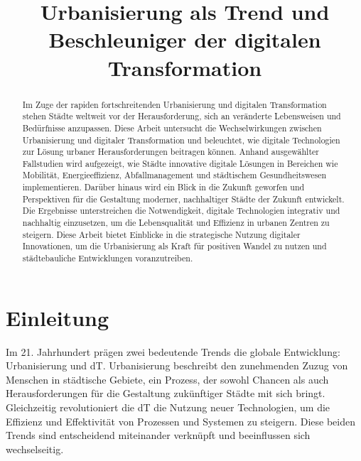 \documentclass[conference,compsoc,final,a4paper, onecolumn, 11pt]{IEEEtran}
\newcommand{\dokumententitel}[0]{Urbanisierung als Trend und Beschleuniger der digitalen Transformation}
\begin{document}
\title{\dokumententitel}

\author{
  \and
  \and
}

\maketitle
\thispagestyle{plain}
\pagestyle{plain}

\begin{abstract}
Im Zuge der rapiden fortschreitenden Urbanisierung und digitalen Transformation stehen Städte weltweit vor der Herausforderung, sich an veränderte Lebensweisen und Bedürfnisse anzupassen. 
Diese Arbeit untersucht die Wechselwirkungen zwischen Urbanisierung und digitaler Transformation und beleuchtet, wie digitale Technologien zur Lösung urbaner Herausforderungen beitragen können. 
Anhand ausgewählter Fallstudien wird aufgezeigt, wie Städte innovative digitale Lösungen in Bereichen wie Mobilität, Energieeffizienz, Abfallmanagement und städtischem Gesundheitswesen implementieren. 
Darüber hinaus wird ein Blick in die Zukunft geworfen und Perspektiven für die Gestaltung moderner, nachhaltiger Städte der Zukunft entwickelt. 
Die Ergebnisse unterstreichen die Notwendigkeit, digitale Technologien integrativ und nachhaltig einzusetzen, um die Lebensqualität und Effizienz in urbanen Zentren zu steigern. 
Diese Arbeit bietet Einblicke in die strategische Nutzung digitaler Innovationen, um die Urbanisierung als Kraft für positiven Wandel zu nutzen und städtebauliche Entwicklungen voranzutreiben.
\end{abstract}

{\tableofcontents}


\section{Einleitung}
Im 21. Jahrhundert prägen zwei bedeutende Trends die globale Entwicklung: Urbanisierung und \ac{dT}. 
Urbanisierung beschreibt den zunehmenden Zuzug von Menschen in städtische Gebiete, ein Prozess, der sowohl Chancen als auch Herausforderungen für die Gestaltung zukünftiger Städte mit sich bringt. 
Gleichzeitig revolutioniert die \ac{dT} die Nutzung neuer Technologien, um die Effizienz und Effektivität von Prozessen und Systemen zu steigern. 
Diese beiden Trends sind entscheidend miteinander verknüpft und beeinflussen sich wechselseitig.
\end{document}
